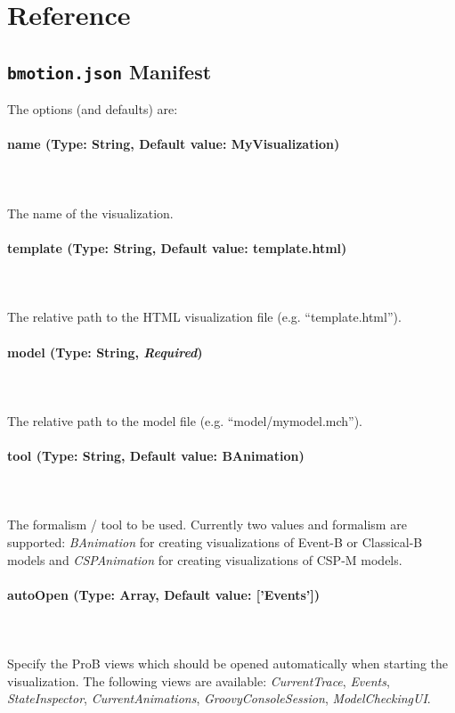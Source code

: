 \section{Reference}
\label{reference}

\subsection{\texttt{bmotion.json} Manifest}
\label{sec:manifest}

The options (and defaults) are:

\paragraph{name (Type: String, Default value: MyVisualization)}
\mbox{}\\\\
The name of the visualization.

\paragraph{template (Type: String, Default value: template.html)}
\mbox{}\\\\
The relative path to the HTML visualization file  (e.g. ``template.html'').

\paragraph{model (Type: String, \textit{Required})}
\mbox{}\\\\
The relative path to the model file (e.g. ``model/mymodel.mch'').

\paragraph{tool (Type: String, Default value: BAnimation)}
\mbox{}\\\\
The formalism / tool to be used. Currently two values and formalism are supported: \textit{BAnimation} for creating visualizations of Event-B or Classical-B models and \textit{CSPAnimation} for creating visualizations of CSP-M models.

\paragraph{autoOpen (Type: Array, Default value: ['Events'])}
\mbox{}\\\\
Specify the ProB views which should be opened automatically when starting the visualization. 
The following views are available: \textit{CurrentTrace}, \textit{Events}, \textit{StateInspector}, \textit{CurrentAnimations}, \textit{GroovyConsoleSession}, \textit{ModelCheckingUI}.
